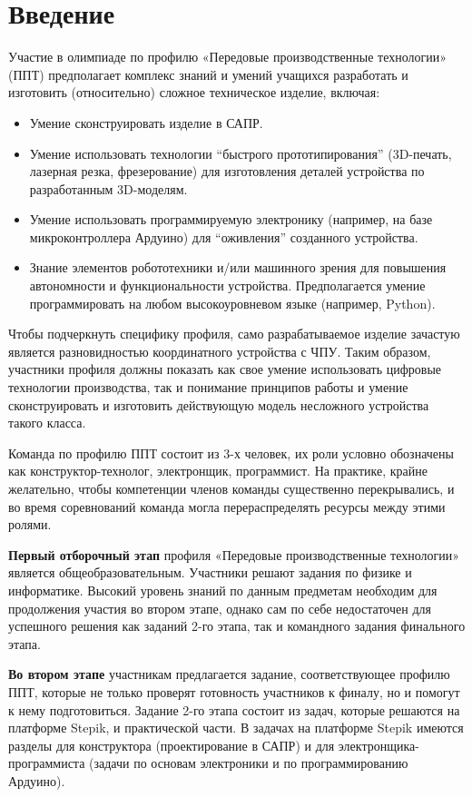 %

\section*{Введение}

Участие в олимпиаде по профилю «Передовые производственные технологии» (ППТ) предполагает комплекс знаний и умений учащихся разработать и изготовить (относительно) сложное техническое изделие, включая:
\begin{itemize}
    \item Умение сконструировать изделие в САПР.
    \item Умение использовать технологии “быстрого прототипирования” (3D-печать, лазерная резка, фрезерование) для изготовления деталей устройства по разработанным 3D-моделям. 
    \item Умение использовать программируемую электронику (например, на базе микроконтроллера Ардуино) для “оживления” созданного устройства.
    \item Знание элементов робототехники и/или машинного зрения для повышения автономности и функциональности устройства.  Предполагается умение программировать на любом высокоуровневом языке (например, Python).
\end{itemize}

Чтобы подчеркнуть специфику профиля, само разрабатываемое изделие зачастую является разновидностью координатного устройства с ЧПУ.  Таким образом, участники профиля должны показать как свое умение использовать цифровые технологии производства, так и понимание принципов работы и умение сконструировать и изготовить действующую модель несложного устройства такого класса.

Команда по профилю ППТ состоит из 3-х человек, их роли условно обозначены как конструктор-технолог, электронщик, программист.  На практике, крайне желательно, чтобы компетенции членов команды существенно перекрывались, и во время соревнований команда могла перераспределять ресурсы между этими ролями.

\textbf{Первый отборочный этап} профиля «Передовые производственные технологии» является общеобразовательным. Участники решают задания по физике и информатике. Высокий уровень знаний по данным предметам необходим для продолжения участия во втором этапе, однако сам по себе недостаточен для успешного решения как заданий 2-го этапа, так и командного задания финального этапа. 

\textbf{Во втором этапе} участникам предлагается задание, соответствующее профилю ППТ, которые не только проверят готовность участников к финалу, но и помогут к нему подготовиться. Задание 2-го этапа состоит из задач, которые решаются на платформе Stepik, и практической части. В задачах на платформе Stepik имеются разделы для конструктора (проектирование в САПР) и для электронщика-программиста (задачи по основам электроники и по программированию Ардуино). 

